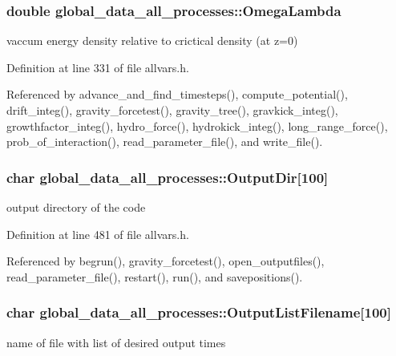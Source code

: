 \hypertarget{structglobal__data__all__processes_ae272abeafbcb16230374a903a3e4e298}{
\subsubsection[{OmegaLambda}]{\setlength{\rightskip}{0pt plus 5cm}double {\bf global\_\-data\_\-all\_\-processes::OmegaLambda}}}
\label{structglobal__data__all__processes_ae272abeafbcb16230374a903a3e4e298}
vaccum energy density relative to crictical density (at z=0) 

Definition at line 331 of file allvars.h.



Referenced by advance\_\-and\_\-find\_\-timesteps(), compute\_\-potential(), drift\_\-integ(), gravity\_\-forcetest(), gravity\_\-tree(), gravkick\_\-integ(), growthfactor\_\-integ(), hydro\_\-force(), hydrokick\_\-integ(), long\_\-range\_\-force(), prob\_\-of\_\-interaction(), read\_\-parameter\_\-file(), and write\_\-file().

\hypertarget{structglobal__data__all__processes_aebda5d1b80cfb767b9668d7858c36bcc}{
\subsubsection[{OutputDir}]{\setlength{\rightskip}{0pt plus 5cm}char {\bf global\_\-data\_\-all\_\-processes::OutputDir}\mbox{[}100\mbox{]}}}
\label{structglobal__data__all__processes_aebda5d1b80cfb767b9668d7858c36bcc}
output directory of the code 

Definition at line 481 of file allvars.h.



Referenced by begrun(), gravity\_\-forcetest(), open\_\-outputfiles(), read\_\-parameter\_\-file(), restart(), run(), and savepositions().

\hypertarget{structglobal__data__all__processes_a063be13ecadec873ebaad1b3645a5323}{
\subsubsection[{OutputListFilename}]{\setlength{\rightskip}{0pt plus 5cm}char {\bf global\_\-data\_\-all\_\-processes::OutputListFilename}\mbox{[}100\mbox{]}}}
\label{structglobal__data__all__processes_a063be13ecadec873ebaad1b3645a5323}
name of file with list of desired output times 

